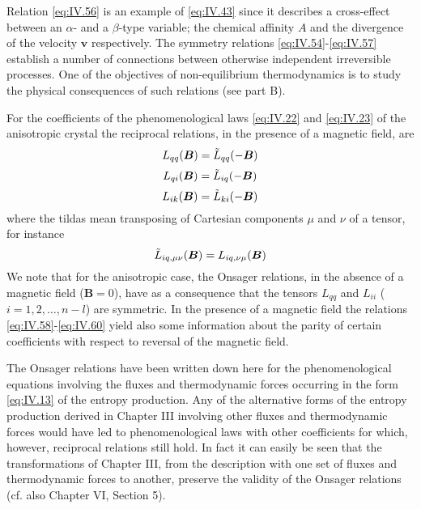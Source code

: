 Relation \eqref{eq:IV.56} is an example of \eqref{eq:IV.43} since it describes a cross-effect between an $\alpha$- and a $\beta$-type variable; the chemical affinity $A$ and the divergence of the velocity $\bm{v}$ respectively. The symmetry relations \eqref{eq:IV.54}-\eqref{eq:IV.57} establish a number of connections between otherwise independent irreversible processes. One of the objectives of non-equilibrium thermodynamics is to study the physical consequences of such relations (see part B).

For the coefficients of the phenomenological laws \eqref{eq:IV.22} and \eqref{eq:IV.23} of the anisotropic crystal the reciprocal relations, in the presence of a magnetic field, are
\begin{equation}
L_{qq} (\bm{B}) = \Tilde{L}_{qq} (-\bm{B})
    \label{eq:IV.58}
\end{equation}
\begin{equation}
L_{qi} (\bm{B}) = \Tilde{L}_{iq} (-\bm{B})
    \label{eq:IV.59}
\end{equation}
\begin{equation}
L_{ik} (\bm{B}) = \Tilde{L}_{ki} (-\bm{B})
    \label{eq:IV.60}
\end{equation}
where the tildas mean transposing of Cartesian components $\mu$ and $\nu$
of a tensor, for instance
\begin{equation}
\Tilde{L}_{iq, \mu \nu} (\bm{B}) = L_{iq, \nu \mu} (\bm{B})
    \label{eq:IV.61}
\end{equation}
We note that for the anisotropic case, the Onsager relations, in the absence of a magnetic field ($\bm{B} = 0$), have as a consequence that the tensors $L_{qq}$ and $L_{ii}$ ($i = 1, 2, \ldots , n - l$) are symmetric. In the presence of a magnetic field the relations \eqref{eq:IV.58}-\eqref{eq:IV.60} yield also some information about the parity of certain coefficients with respect to reversal of the magnetic field.

The Onsager relations have been written down here for the phenomenological equations involving the fluxes and thermodynamic forces occurring in the form \eqref{eq:IV.13} of the entropy production. Any of the alternative forms of the entropy production derived in Chapter III involving other fluxes and thermodynamic forces would have led to phenomenological laws with other coefficients for which, however, reciprocal relations still hold. In fact it can easily be seen that the transformations of Chapter III, from the description with one set of fluxes and thermodynamic forces to another, preserve the validity of the Onsager relations (cf. also Chapter VI, Section 5).

